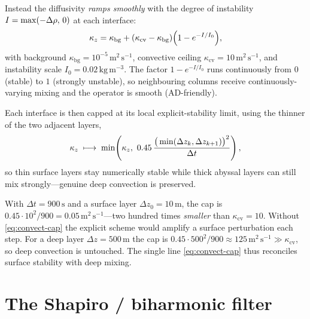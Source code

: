 Instead the diffusivity \emph{ramps smoothly} with the degree of instability
$I = \max(-\Delta\rho,\,0)$ at each interface:
\begin{equation}
\kappa_{z} = \kappa_{\mathrm{bg}} + (\kappa_{\mathrm{cv}}-\kappa_{\mathrm{bg}})
\Big(1 - e^{-I/I_0}\Big),
\label{eq:convect-ramp}
\end{equation}
with background $\kappa_{\mathrm{bg}}=10^{-5}\,\mathrm{m^2\,s^{-1}}$, convective
ceiling $\kappa_{\mathrm{cv}}=10\,\mathrm{m^2\,s^{-1}}$, and instability scale
$I_0=0.02\,\mathrm{kg\,m^{-3}}$. The factor $1-e^{-I/I_0}$ runs continuously from $0$
(stable) to $1$ (strongly unstable), so neighbouring columns receive
continuously-varying mixing and the operator is smooth (AD-friendly).

Each interface is then capped at its local explicit-stability limit, using the
thinner of the two adjacent layers,
\begin{equation}
\kv \;\longmapsto\; \min\!\left(\kv,\ 0.45\,\frac{\big(\min(\Delta z_k,\Delta z_{k+1})\big)^2}{\Delta t}\right),
\label{eq:convect-cap}
\end{equation}
so thin surface layers stay numerically stable while thick abyssal layers can still
mix strongly---genuine deep convection is preserved.

\begin{example}
With $\Delta t=900\,\mathrm{s}$ and a surface layer $\Delta z_0 = 10\,\mathrm{m}$,
the cap is $0.45\cdot 10^2/900 = 0.05\,\mathrm{m^2\,s^{-1}}$---two hundred times
\emph{smaller} than $\kappa_{\mathrm{cv}}=10$. Without \eqref{eq:convect-cap} the
explicit scheme would amplify a surface perturbation each step. For a deep layer
$\Delta z=500\,\mathrm{m}$ the cap is $0.45\cdot 500^2/900\approx 125\,\mathrm{m^2\,s^{-1}}\gg\kappa_{\mathrm{cv}}$,
so deep convection is untouched. The single line \eqref{eq:convect-cap} thus reconciles
surface stability with deep mixing.
\end{example}

\section{The Shapiro / biharmonic filter}\label{sec:shapiro}

